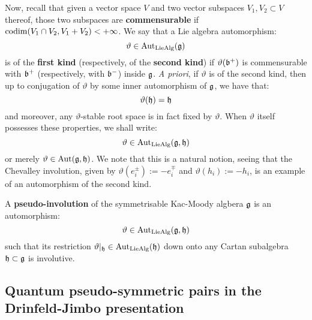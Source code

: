         Now, recall that given a vector space $V$ and two vector subspaces $V_1, V_2 \subset V$ thereof, those two subspaces are \textbf{commensurable} if $\operatorname{codim}(V_1 \cap V_2, V_1 + V_2) < +\infty$. We say that a Lie algebra automorphism:
            $$\vartheta \in \operatorname{Aut}_{\mathrm{Lie}\mathrm{Alg}}(\mathfrak{g})$$
        is of the \textbf{first kind} (respectively, of the \textbf{second kind}) if $\vartheta(\mathfrak{b}^+)$ is commensurable with $\mathfrak{b}^+$ (respectively, with $\mathfrak{b}^-$) inside $\mathfrak{g}$. \textit{A priori}, if $\vartheta$ is of the second kind, then up to conjugation of $\vartheta$ by some inner automorphism of $\mathfrak{g}$, we have that:
            $$\vartheta(\mathfrak{h}) = \mathfrak{h}$$
        and moreover, any $\vartheta$-stable root space is in fact fixed by $\vartheta$. When $\vartheta$ itself possesses these properties, we shall write:
            $$\vartheta \in \operatorname{Aut}_{\mathrm{Lie}\mathrm{Alg}}(\mathfrak{g}, \mathfrak{h})$$
        or merely $\vartheta \in \operatorname{Aut}(\mathfrak{g}, \mathfrak{h})$. We note that this is a natural notion, seeing that the Chevalley involution, given by $\vartheta(e_i^{\pm}) := -e_i^{\mp}$ and $\vartheta(h_i) := -h_i$, is an example of an automorphism of the second kind. 
        \begin{definition} \label{def: pseudo_involutions}
            A \textbf{pseudo-involution} of the symmetrisable Kac-Moody algbera $\mathfrak{g}$ is an automorphism:
                $$\vartheta \in \operatorname{Aut}_{\mathrm{Lie}\mathrm{Alg}}(\mathfrak{g}, \mathfrak{h})$$
            such that its restriction $\vartheta|_{\mathfrak{h}} \in \operatorname{Aut}_{\mathrm{Lie}\mathrm{Alg}}(\mathfrak{h})$ down onto any Cartan subalgebra $\mathfrak{h} \subset \mathfrak{g}$ is involutive. 
        \end{definition}

    \subsection{Quantum pseudo-symmetric pairs in the Drinfeld-Jimbo presentation}


